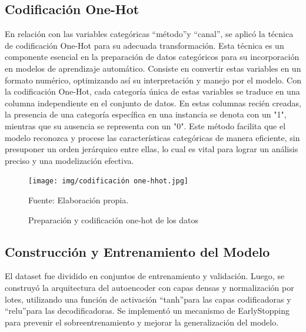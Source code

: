 \subsection{Codificación One-Hot}
En relación con las variables categóricas \textquotedblleft método\textquotedblright y \textquotedblleft canal\textquotedblright, se aplicó la técnica de codificación One-Hot para su adecuada transformación. Esta técnica es un componente esencial en la preparación de datos categóricos para su incorporación en modelos de aprendizaje automático. Consiste en convertir estas variables en un formato numérico, optimizando así su interpretación y manejo por el modelo. Con la codificación One-Hot, cada categoría única de estas variables se traduce en una columna independiente en el conjunto de datos. En estas columnas recién creadas, la presencia de una categoría específica en una instancia se denota con un "1", mientras que su ausencia se representa con un "0". Este método facilita que el modelo reconozca y procese las características categóricas de manera eficiente, sin presuponer un orden jerárquico entre ellas, lo cual es vital para lograr un análisis preciso y una modelización efectiva.


\begin{figure}[H]
    \begin{minipage}[t]{0.9\textwidth}
        \caption{Preparación y codificación one-hot de los datos}
        \label{codificación_autoencoder}        
    \end{minipage}

    \vspace{10pt}

    \begin{minipage}[b]{0.9\textwidth}
        \centering
        \texttt{[image: img/codificación one-hhot.jpg]}        
    \end{minipage}

    \begin{minipage}[t]{0.9\textwidth}
        Fuente: Elaboración propia.
    \end{minipage}
\end{figure}


\subsection{Construcción y Entrenamiento del Modelo}

El dataset fue dividido en conjuntos de entrenamiento y validación. Luego, se construyó la arquitectura del autoencoder con capas densas y normalización por lotes, utilizando una función de activación \textquotedblleft tanh\textquotedblright para las capas codificadoras y \textquotedblleft relu\textquotedblright para las decodificadoras. Se implementó un mecanismo de EarlyStopping para prevenir el sobreentrenamiento y mejorar la generalización del modelo.

